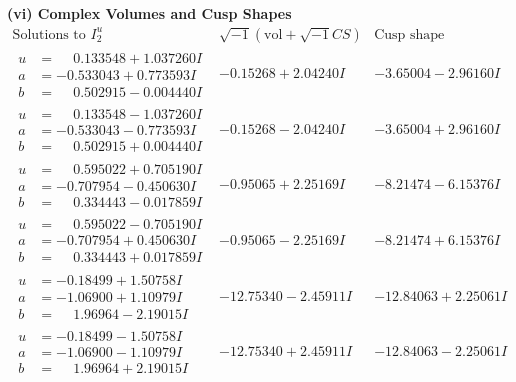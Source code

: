 \documentclass[1p]{elsarticle_modified}
\theoremstyle{definition}
\newcommand{\I}{\sqrt{-1}}
\begin{document}
\newpage\flushleft \textbf{(vi) Complex Volumes and Cusp Shapes}
$$\begin{array}{c|c|c}  
\text{Solutions to }I^u_{2}& \I (\text{vol} + \sqrt{-1}CS) & \text{Cusp shape}\\
 \hline 
\begin{aligned}
u &= \phantom{-}0.133548 + 1.037260 I \\
a &= -0.533043 + 0.773593 I \\
b &= \phantom{-}0.502915 - 0.004440 I\end{aligned}
 & -0.15268 + 2.04240 I & -3.65004 - 2.96160 I \\ \hline\begin{aligned}
u &= \phantom{-}0.133548 - 1.037260 I \\
a &= -0.533043 - 0.773593 I \\
b &= \phantom{-}0.502915 + 0.004440 I\end{aligned}
 & -0.15268 - 2.04240 I & -3.65004 + 2.96160 I \\ \hline\begin{aligned}
u &= \phantom{-}0.595022 + 0.705190 I \\
a &= -0.707954 - 0.450630 I \\
b &= \phantom{-}0.334443 - 0.017859 I\end{aligned}
 & -0.95065 + 2.25169 I & -8.21474 - 6.15376 I \\ \hline\begin{aligned}
u &= \phantom{-}0.595022 - 0.705190 I \\
a &= -0.707954 + 0.450630 I \\
b &= \phantom{-}0.334443 + 0.017859 I\end{aligned}
 & -0.95065 - 2.25169 I & -8.21474 + 6.15376 I \\ \hline\begin{aligned}
u &= -0.18499 + 1.50758 I \\
a &= -1.06900 + 1.10979 I \\
b &= \phantom{-}1.96964 - 2.19015 I\end{aligned}
 & -12.75340 - 2.45911 I & -12.84063 + 2.25061 I \\ \hline\begin{aligned}
u &= -0.18499 - 1.50758 I \\
a &= -1.06900 - 1.10979 I \\
b &= \phantom{-}1.96964 + 2.19015 I\end{aligned}
 & -12.75340 + 2.45911 I & -12.84063 - 2.25061 I \\ \hline\begin{aligned}

\end{aligned}
\end{array}$$
\end{document}
